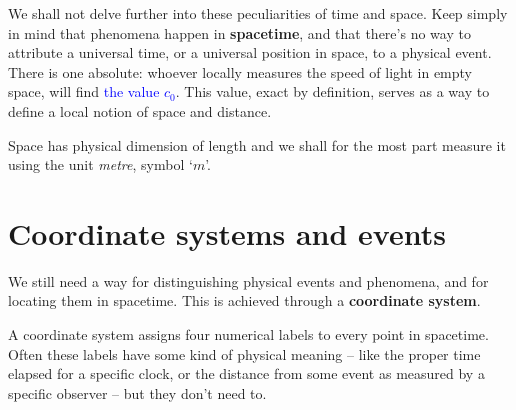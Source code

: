 \documentclass[a4paper,12pt,%
onecolumn,oneside,titlepage,%
british%
]{memoir}
\renewcommand*{\|}[1][]{\nonscript\:#1\vert\nonscript\:\mathopen{}}
\newcommand*{\sect}{\S}%
\renewcommand*{\autoref}[2]{\sidepar{\vspace{-1ex}\footnotesize{\color{blue}\faIcon{%
angle-right%
}\enspace\sect\,\ref{#1} page\,\pageref{#1}}}\textcolor{blue}{#2}}
\newcommand*{\yc}{c_{0}} %
\begin{document}
\smallskip

We shall not delve further into these peculiarities of time and space. Keep simply in mind that phenomena happen in \textbf{spacetime}, and that there's no way to attribute a universal time, or a universal position in space, to a physical event. There is one absolute: whoever locally measures the speed of light in empty space, will find \autoref{eq:c}{the value $\yc$}. This value, exact by definition, serves as a way to define a local notion of space and distance.

\smallskip

Space has physical dimension of \textsf{length} and we shall for the most part measure it using the unit \emph{metre}, symbol \enquote*{$\unit{m}$}.




\section{Coordinate systems and events}
\label{sec:coords}

We still need a way for distinguishing physical events and phenomena, and for locating them in spacetime. This is achieved through a \textbf{coordinate system}.

A coordinate system assigns four numerical labels to every point in spacetime.
%
%
Often these labels have some kind of physical meaning -- like the proper time elapsed for a specific clock, or the distance from some event as measured by a specific observer -- but they don't need to.
\end{document}
